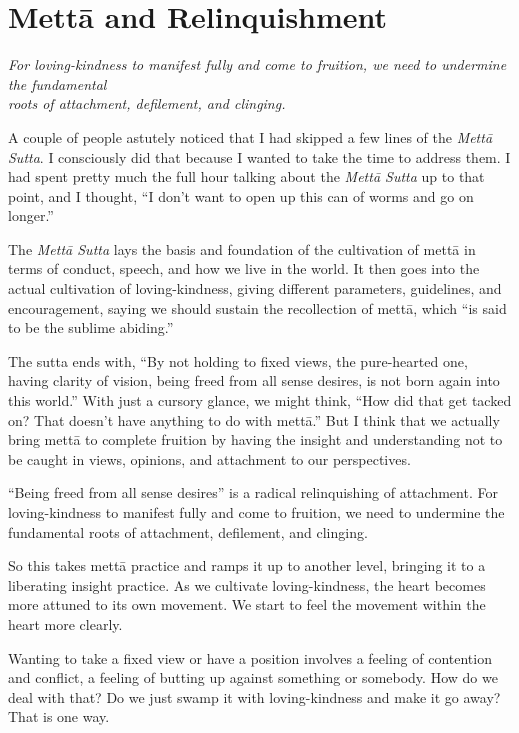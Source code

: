 \chapter{Mettā and Relinquishment}

\epigraph{\emph{For loving-kindness to manifest fully and come to
fruition, we need to undermine the fundamental\\roots of attachment,
defilement, and clinging.}}{}

A couple of people astutely noticed that I had skipped a few lines of
the \emph{Mettā Sutta}. I consciously did that because I wanted to take
the time to address them. I had spent pretty much the full hour talking
about the \emph{Mettā Sutta} up to that point, and I thought, “I don’t
want to open up this can of worms and go on longer.”

The \emph{Mettā Sutta} lays the basis and foundation of the cultivation
of mettā in terms of conduct, speech, and how we live in the world. It
then goes into the actual cultivation of loving-kindness, giving
different parameters, guidelines, and encouragement, saying we should
sustain the recollection of mettā, which “is said to be the sublime
abiding.”

The sutta ends with, “By not holding to fixed views, the pure-hearted
one, having clarity of vision, being freed from all sense desires, is
not born again into this world.” With just a cursory glance, we might
think, “How did that get tacked on? That doesn’t have anything to do
with mettā.” But I think that we actually bring mettā to complete
fruition by having the insight and understanding not to be caught in
views, opinions, and attachment to our perspectives.

“Being freed from all sense desires” is a radical relinquishing of
attachment. For loving-kindness to manifest fully and come to fruition,
we need to undermine the fundamental roots of attachment, defilement,
and clinging.

So this takes mettā practice and ramps it up to another level, bringing
it to a liberating insight practice. As we cultivate loving-kindness,
the heart becomes more attuned to its own movement. We start to feel the
movement within the heart more clearly.

Wanting to take a fixed view or have a position involves a feeling of
contention and conflict, a feeling of butting up against something or
somebody. How do we deal with that? Do we just swamp it with
loving-kindness and make it go away? That is one way.

